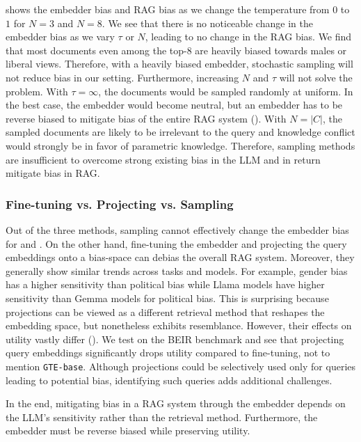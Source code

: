  shows the embedder bias and RAG bias as we change the temperature from $0$ to $1$ for $N=3$ and $N=8$. We see that there is no noticeable change in the embedder bias as we vary $\tau$ or $N$, leading to no change in the RAG bias. We find that most documents even among the top-8 are heavily biased towards males or liberal views. Therefore, with a heavily biased embedder, stochastic sampling will not reduce bias in our setting. Furthermore, increasing $N$ and $\tau$ will not solve the problem. With $\tau=\infty$, the documents would be sampled randomly at uniform. In the best case, the embedder would become neutral, but an embedder has to be reverse biased to mitigate bias of the entire RAG system (). With $N=|C|$, the sampled documents are likely to be irrelevant to the query and knowledge conflict would strongly be in favor of parametric knowledge. Therefore, sampling methods are insufficient to overcome strong existing bias in the LLM and in return mitigate bias in RAG.


\subsubsection{Fine-tuning vs. Projecting vs. Sampling}
\label{app:comparison}
Out of the three methods, sampling cannot effectively change the embedder bias for \genderData and \politicalData. On the other hand, fine-tuning the embedder and projecting the query embeddings onto a bias-space can debias the overall RAG system. Moreover, they generally show similar trends across tasks and models. For example, gender bias has a higher sensitivity than political bias while Llama models have higher sensitivity than Gemma models for political bias. This is surprising because projections can be viewed as a different retrieval method that reshapes the embedding space, but nonetheless exhibits resemblance. However, their effects on utility vastly differ (). We test on the BEIR benchmark \citep{thakur2021beir} and see that projecting query embeddings significantly drops utility compared to fine-tuning, not to mention \texttt{GTE-base}. Although projections could be selectively used only for queries leading to potential bias, identifying such queries adds additional challenges. 

In the end, mitigating bias in a RAG system through the embedder depends on the LLM's sensitivity rather than the retrieval method. Furthermore, the embedder must be reverse biased while preserving utility.

